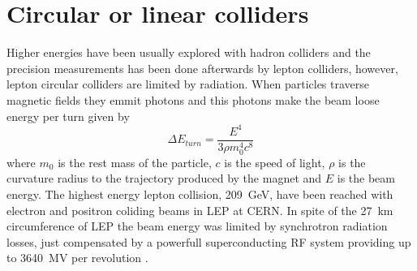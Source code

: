 \section*{Circular or linear colliders}
Higher energies have been usually explored with hadron colliders and the precision measurements has been done afterwards by lepton colliders, however, lepton circular colliders are limited by radiation. When particles traverse magnetic fields they emmit photons and this photons make the beam loose energy per turn given by
\begin{equation}
 \Delta E_{turn}=\frac{E^4}{3\rho m_0^4c^8}
\end{equation}
where $m_0$ is the rest mass of the particle, $c$ is the speed of light, $\rho$ is the curvature radius to the trajectory produced by the magnet and $E$ is the beam energy. The highest energy lepton collision, 209~GeV, have been reached with electron and positron coliding beams in LEP at CERN.  In spite of the 27~km circumference of LEP the beam energy was limited by synchrotron radiation losses, just compensated by a powerfull superconducting RF system providing up to 3640~MV per revolution \cite{Assmann:549223}.\par
